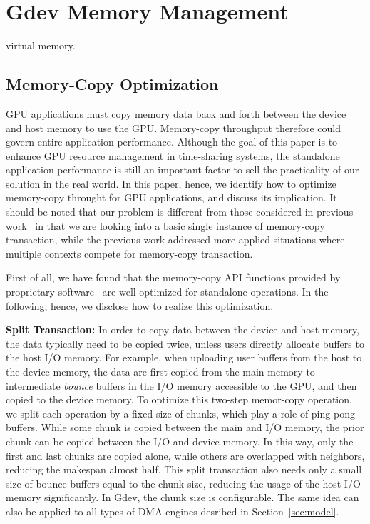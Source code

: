 \section{Gdev Memory Management}
\label{sec:memory_management}

virtual memory.

\subsection{Memory-Copy Optimization}
\label{sec:memory_copy}

GPU applications must copy memory data back and forth between the device
and host memory to use the GPU.
Memory-copy throughput therefore could govern entire application
performance.
Although the goal of this paper is to enhance GPU resource management in
time-sharing systems, the standalone application performance is still an
important factor to sell the practicality of our solution in the
real world.
In this paper, hence, we identify how to optimize memory-copy throught
for GPU applications, and discuss its implication.
It should be noted that our problem is different from those considered
in previous work~\cite{Jablin_PLDI11, Rossbach_SOSP11} in that we are
looking into a basic single instance of memory-copy transaction, while
the previous work addressed more applied situations where multiple
contexts compete for memory-copy transaction.

First of all, we have found that the memory-copy API functions provided
by proprietary software~\cite{CUDA40} are well-optimized for standalone
operations.
In the following, hence, we disclose how to realize this optimization.

\textbf{Split Transaction:}
In order to copy data between the device and host memory, the data
typically need to be copied twice, unless users directly allocate
buffers to the host I/O memory. 
For example, when uploading user buffers from the host to the device
memory, the data are first copied from the main memory to intermediate
\textit{bounce} buffers in the I/O memory accessible to the GPU, and
then copied to the device memory.
To optimize this two-step memor-copy operation, we split each operation
by a fixed size of chunks, which play a role of ping-pong buffers.
While some chunk is copied between the main and I/O memory, the prior
chunk can be copied between the I/O and device memory.
In this way, only the first and last chunks are copied alone, while
others are overlapped with neighbors, reducing the makespan almost half.
This split transaction also needs only a small size of bounce buffers
equal to the chunk size, reducing the usage of the host I/O memory
significantly.
In Gdev, the chunk size is configurable.
The same idea can also be applied to all types of DMA engines desribed in
Section~\ref{sec:model}.

